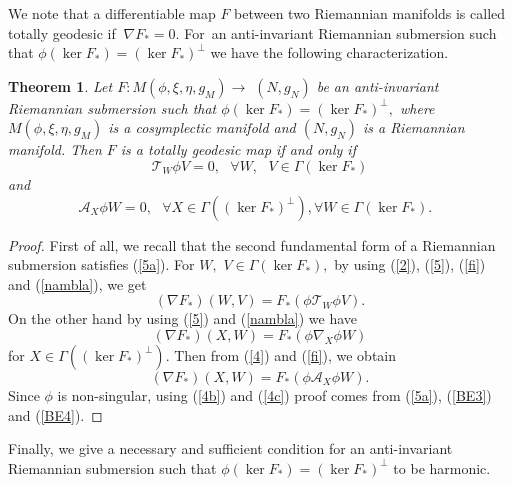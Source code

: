 \documentclass{amsart}
\newtheorem{theorem}{Theorem}
\theoremstyle{plain}
\numberwithin{equation}{section}
\begin{document}
We note that a differentiable map $F$ between two Riemannian manifolds is
called totally geodesic if $\ \nabla F_{\ast }=0.$ For\ an anti-invariant
Riemannian submersion such that $\phi (\ker F_{\ast })=(\ker F_{\ast
})^{\bot }$ we have the following characterization.

\begin{theorem}
Let $F:M(\phi ,\xi ,\eta ,g_{M})\rightarrow $ $(N,g_{N})$ be an
anti-invariant Riemannian submersion such that $\phi (\ker F_{\ast })=(\ker
F_{\ast })^{\bot },$ where $M(\phi ,\xi ,\eta ,g_{M})$ is a cosymplectic
manifold and $(N,g_{N})$ is a Riemannian manifold. Then $F$ is a totally
geodesic map if and only if\begin{equation}
\mathcal{T}_{W}\phi V=0,\text{ \ \ }\forall W,\text{ }V\in \Gamma (\ker
F_{\ast })  \label{BE1}
\end{equation}and\begin{equation}
\mathcal{A}_{X}\phi W=0,\text{ \ }\forall X\in \Gamma ((\ker F_{\ast
})^{\bot }),\forall W\in \Gamma (\ker F_{\ast }).\text{\ }  \label{BE2}
\end{equation}
\end{theorem}

\begin{proof}
First of all, we recall that the second fundamental form of a Riemannian
submersion satisfies (\ref{5a}). For $W,$ $V\in \Gamma (\ker F_{\ast }),$ by
using (\ref{2}), (\ref{5}), (\ref{fi}) and (\ref{nambla}), we get\begin{equation}
(\nabla F_{\ast })(W,V)=F_{\ast }(\phi \mathcal{T}_{W}\phi V).  \label{BE3}
\end{equation}On the other hand by using (\ref{5}) and (\ref{nambla}) we have\begin{equation*}
(\nabla F_{\ast })(X,W)=F_{\ast }(\phi \nabla _{X}\phi W)
\end{equation*}for $X\in \Gamma ((\ker F_{\ast })^{\bot }).$ Then from (\ref{4}) and (\ref{fi}), we obtain 
\begin{equation}
(\nabla F_{\ast })(X,W)=F_{\ast }(\phi \mathcal{A}_{X}\phi W).  \label{BE4}
\end{equation}Since $\phi $ is non-singular, using (\ref{4b}) and (\ref{4c}) proof comes
from (\ref{5a}), (\ref{BE3}) and (\ref{BE4}).
\end{proof}

Finally, we give a necessary and sufficient condition for an anti-invariant
Riemannian submersion such that $\phi (\ker F_{\ast })=(\ker F_{\ast
})^{\bot }$ to be harmonic.
\end{document}
